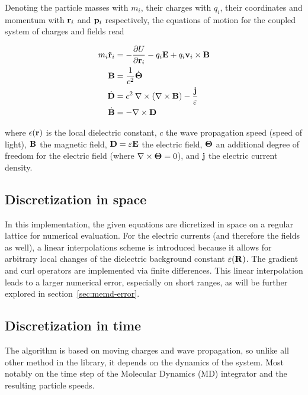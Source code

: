 Denoting the particle masses with $m_i$, their charges with $q_i$, their coordinates and momentum with $\mathbf{r}_i$ and $\mathbf{p}_i$ respectively, the equations of motion for the coupled system of charges and fields read

\begin{align}
m_i\ddot{\mathbf{r}}_i &= -\frac{\partial U}{\partial\mathbf{r}_i} -q_i \mathbf{E}
     + q_i \mathbf{v}_i\times\mathbf{B}
\label{eq:force}\\
\mathbf{B} &= \frac{1}{c^2}\dot{\mathbf{\Theta}}
\label{eq:theta}\\
\dot{\mathbf{D}} &= c^2\: \nabla \times \left( \nabla \times \mathbf{B} \right) - \frac{\mathbf{j}}{\varepsilon}
\label{eq:dfield}\\
\dot{\mathbf{B}} &=  -\nabla\times\mathbf{D}
\label{eq:bfield}
\end{align}

where $\epsilon(\mathbf{r})$ is the local dielectric constant, $c$ the wave propagation speed (speed of light), $\mathbf{B}$ the magnetic field, $\mathbf{D}=\varepsilon\mathbf{E}$ the electric field, $\mathbf{\Theta}$ an additional degree of freedom for the electric field (where $\nabla\times\mathbf{\Theta}=0$), and $\mathbf{j}$ the electric current density.

\subsection{Discretization in space}
\label{sec:memd-space-discretization}

In this implementation, the given equations are dicretized in space on a regular lattice for numerical evaluation. For the electric currents (and therefore the fields as well), a linear interpolations scheme is introduced because it allows for arbitrary local changes of the dielectric background constant $\varepsilon(\mathbf{R})$. The gradient and curl operators are implemented via finite differences. This linear interpolation leads to a larger numerical error, especially on short ranges, as will be further explored in section~\ref{sec:memd-error}.

\subsection{Discretization in time}
\label{sec:memd-time-discretization}

The \memd{} algorithm is based on moving charges and wave propagation, so unlike all other method in the \project{} library, it depends on the dynamics of the system. Most notably on the time step of the Molecular Dynamics (MD) integrator and the resulting particle speeds.

